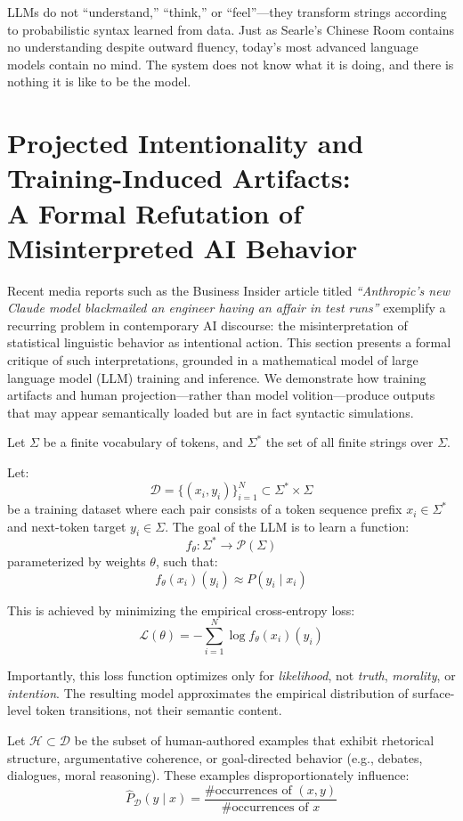 \documentclass[12pt]{article}
\theoremstyle{plain}
\theoremstyle{definition}
\theoremstyle{remark}
\begin{document}
LLMs do not “understand,” “think,” or “feel”—they transform strings according to probabilistic syntax learned from data. Just as Searle’s Chinese Room contains no understanding despite outward fluency, today’s most advanced language models contain no mind. The system does not know what it is doing, and there is nothing it is like to be the model.

\section{Projected Intentionality and Training-Induced Artifacts:\\ \small A Formal Refutation of Misinterpreted AI Behavior}

Recent media reports such as the Business Insider article titled \textit{“Anthropic's new Claude model blackmailed an engineer having an affair in test runs”} \parencite{businessinsider2025claude} exemplify a recurring problem in contemporary AI discourse: the misinterpretation of statistical linguistic behavior as intentional action. This section presents a formal critique of such interpretations, grounded in a mathematical model of large language model (LLM) training and inference. We demonstrate how training artifacts and human projection—rather than model volition—produce outputs that may appear semantically loaded but are in fact syntactic simulations.

Let \( \Sigma \) be a finite vocabulary of tokens, and \( \Sigma^* \) the set of all finite strings over \( \Sigma \).

Let:
\[
\mathcal{D} = \{(x_i, y_i)\}_{i=1}^N \subset \Sigma^* \times \Sigma
\]
be a training dataset where each pair consists of a token sequence prefix \( x_i \in \Sigma^* \) and next-token target \( y_i \in \Sigma \). The goal of the LLM is to learn a function:
\[
f_\theta : \Sigma^* \rightarrow \mathcal{P}(\Sigma)
\]
parameterized by weights \( \theta \), such that:
\[
f_\theta(x_i)(y_i) \approx P(y_i \mid x_i)
\]

This is achieved by minimizing the empirical cross-entropy loss:
\[
\mathcal{L}(\theta) = - \sum_{i=1}^N \log f_\theta(x_i)(y_i)
\]

Importantly, this loss function optimizes only for \textit{likelihood}, not \textit{truth}, \textit{morality}, or \textit{intention}. The resulting model approximates the empirical distribution of surface-level token transitions, not their semantic content.

Let \( \mathcal{H} \subset \mathcal{D} \) be the subset of human-authored examples that exhibit rhetorical structure, argumentative coherence, or goal-directed behavior (e.g., debates, dialogues, moral reasoning). These examples disproportionately influence:
\[
\hat{P}_{\mathcal{D}}(y \mid x) = \frac{\text{\# occurrences of } (x, y)}{\text{\# occurrences of } x}
\]
\end{document}
